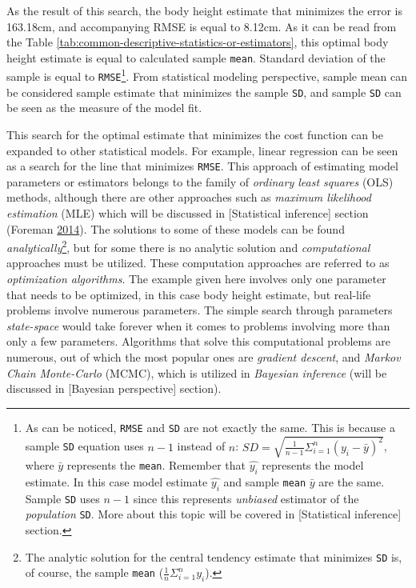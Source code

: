 \documentclass[
]{book}
\begin{document}
As the result of this search, the body height estimate that minimizes the error is 163.18cm, and accompanying RMSE is equal to 8.12cm. As it can be read from the Table \ref{tab:common-descriptive-statistics-or-estimators}, this optimal body height estimate is equal to calculated sample \texttt{mean}. Standard deviation of the sample is equal to \texttt{RMSE}\footnote{As can be noticed, \texttt{RMSE} and \texttt{SD} are not exactly the same. This is because a sample \texttt{SD} equation uses \(n-1\) instead of \(n\): \(SD = \sqrt{\frac{1}{n-1}\Sigma_{i=1}^{n}(y_i -\bar{y})^2}\), where \(\bar{y}\) represents the \texttt{mean}. Remember that \(\hat{y_i}\) represents the model estimate. In this case model estimate \(\hat{y_i}\) and sample \texttt{mean} \(\bar{y}\) are the same. Sample \texttt{SD} uses \(n-1\) since this represents \emph{unbiased} estimator of the \emph{population} \texttt{SD}. More about this topic will be covered in {[}Statistical inference{]} section.}. From statistical modeling perspective, sample mean can be considered sample estimate that minimizes the sample \texttt{SD}, and sample \texttt{SD} can be seen as the measure of the model fit.

This search for the optimal estimate that minimizes the cost function can be expanded to other statistical models. For example, linear regression can be seen as a search for the line that minimizes \texttt{RMSE}. This approach of estimating model parameters or estimators belongs to the family of \emph{ordinary least squares} (OLS) methods, although there are other approaches such as \emph{maximum likelihood estimation} (MLE) which will be discussed in {[}Statistical inference{]} section (Foreman \protect\hyperlink{ref-foremanDataSmartUsing2014}{2014}). The solutions to some of these models can be found \emph{analytically}\footnote{The analytic solution for the central tendency estimate that minimizes \texttt{SD} is, of course, the sample \texttt{mean} (\(\frac{1}{n}\Sigma_{i=1}^{n}y_i\)).}, but for some there is no analytic solution and \emph{computational} approaches must be utilized. These computation approaches are referred to as \emph{optimization algorithms}. The example given here involves only one parameter that needs to be optimized, in this case body height estimate, but real-life problems involve numerous parameters. The simple search through parameters \emph{state-space} would take forever when it comes to problems involving more than only a few parameters. Algorithms that solve this computational problems are numerous, out of which the most popular ones are \emph{gradient descent}, and \emph{Markov Chain Monte-Carlo} (MCMC), which is utilized in \emph{Bayesian inference} (will be discussed in {[}Bayesian perspective{]} section).
\end{document}
